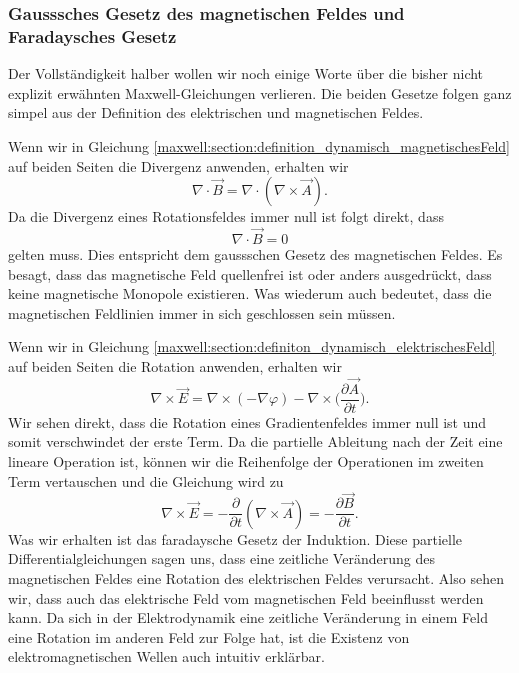 \subsubsection{Gausssches Gesetz des magnetischen Feldes und Faradaysches Gesetz}
Der Vollständigkeit halber wollen wir noch einige Worte über die bisher nicht explizit erwähnten Maxwell-Gleichungen verlieren.
Die beiden Gesetze folgen ganz simpel aus der Definition des elektrischen und magnetischen Feldes.
 
Wenn wir in Gleichung \eqref{maxwell:section:definition_dynamisch_magnetischesFeld} auf beiden Seiten die Divergenz anwenden, erhalten wir
\[
\nabla \cdot \vec{B}
=
\nabla \cdot (\nabla \times \vec{A}).
\]
Da die Divergenz eines Rotationsfeldes immer null ist folgt direkt, dass
\begin{equation}
\nabla \cdot \vec{B}
=
0
\label{maxwell:section:Gauss_magnetisches_Feld}
\end{equation}
gelten muss.
Dies entspricht dem gaussschen Gesetz des magnetischen Feldes.
Es besagt, dass das magnetische Feld quellenfrei ist oder anders ausgedrückt, dass keine magnetische Monopole existieren. Was wiederum auch bedeutet, dass die magnetischen Feldlinien immer in sich geschlossen sein müssen.
 
Wenn wir in Gleichung \eqref{maxwell:section:definiton_dynamisch_elektrischesFeld} auf beiden Seiten die Rotation anwenden, erhalten wir
\[
\nabla \times \vec{E}
=
\nabla \times \left(- \nabla \varphi\right) - \nabla \times \biggl(\frac{\partial \vec{A}}{\partial t}\biggr).
\]
Wir sehen direkt, dass die Rotation eines Gradientenfeldes immer null ist und somit verschwindet der erste Term.
Da die partielle Ableitung nach der Zeit eine lineare Operation ist, können wir die Reihenfolge der Operationen im zweiten Term vertauschen und die Gleichung wird zu
\begin{equation}
\nabla \times \vec{E}
=
- \frac{\partial}{\partial t} (\nabla \times \vec{A})
=
- \frac{\partial \vec{B}}{\partial t}.
\end{equation}
Was wir erhalten ist das faradaysche Gesetz der Induktion.
Diese partielle Differentialgleichungen sagen uns, dass eine zeitliche Veränderung des magnetischen Feldes eine Rotation des elektrischen Feldes verursacht. Also sehen wir, dass auch das elektrische Feld vom magnetischen Feld beeinflusst werden kann. Da sich in der Elektrodynamik eine zeitliche Veränderung in einem Feld eine Rotation im anderen Feld zur Folge hat, ist die Existenz von elektromagnetischen Wellen auch intuitiv erklärbar. 


